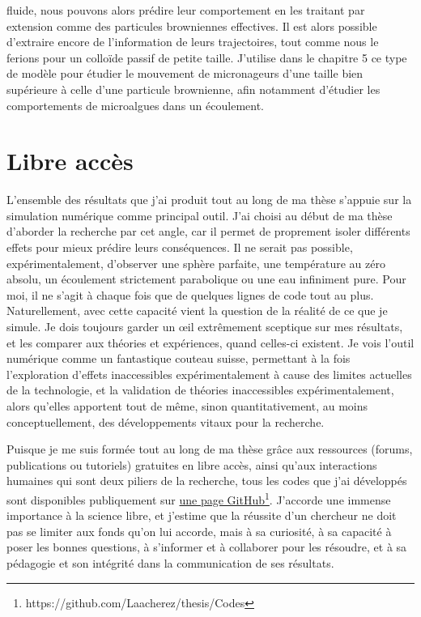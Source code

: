 fluide, nous pouvons alors prédire leur comportement en les traitant par extension comme des particules browniennes effectives. Il est alors possible d'extraire encore de l'information de leurs trajectoires, tout comme nous le ferions pour un colloïde passif de petite taille. J'utilise dans le chapitre 5 ce type de modèle pour étudier le mouvement de micronageurs d'une taille bien supérieure à celle d'une particule brownienne, afin notamment d'étudier les comportements de microalgues dans un écoulement.


\section*{Libre accès}
L'ensemble des résultats que j'ai produit tout au long de ma thèse s'appuie sur la simulation numérique comme principal outil. J'ai choisi au début de ma thèse d'aborder la recherche par cet angle, car il permet de proprement isoler différents effets pour mieux prédire leurs conséquences. Il ne serait pas possible, expérimentalement, d'observer une sphère parfaite, une température au zéro absolu, un écoulement strictement parabolique ou une eau infiniment pure. Pour moi, il ne s'agit à chaque fois que de quelques lignes de code tout au plus. Naturellement, avec cette capacité vient la question de la réalité de ce que je simule. Je dois toujours garder un œil extrêmement sceptique sur mes résultats, et les comparer aux théories et expériences, quand celles-ci existent. Je vois l'outil numérique comme un fantastique couteau suisse, permettant à la fois l'exploration d'effets inaccessibles expérimentalement à cause des limites actuelles de la technologie, et la validation de théories inaccessibles expérimentalement, alors qu'elles apportent tout de même, sinon quantitativement, au moins conceptuellement, des développements vitaux pour la recherche.

Puisque je me suis formée tout au long de ma thèse grâce aux ressources (forums, publications ou tutoriels) gratuites en libre accès, ainsi qu'aux interactions humaines qui sont deux piliers de la recherche, tous les codes que j'ai développés sont disponibles publiquement sur \href{https://github.com/Laacherez/thesis}{une page GitHub}\footnote{https://github.com/Laacherez/thesis/Codes}. J'accorde une immense importance à la science libre, et j'estime que la réussite d'un chercheur ne doit pas se limiter aux fonds qu'on lui accorde, mais à sa curiosité, à sa capacité à poser les bonnes questions, à s'informer et à collaborer pour les résoudre, et à sa pédagogie et son intégrité dans la communication de ses résultats.